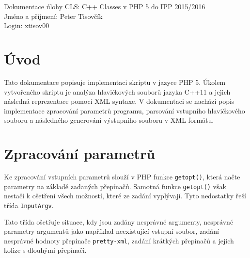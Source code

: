 \documentclass[10pt,a4paper,final]{article}
\begin{document}

  \pagestyle{plain}
  \setcounter{page}{1}
  
  \setlength{\parindent}{1cm}
  \setlength{\parskip}{0.5cm plus4mm minus3mm}
  
  \noindent
  Dokumentace úlohy CLS: C++ Classes v PHP 5 do IPP 2015/2016 \\
  Jméno a příjmení: Peter Tisovčík \\
  Login: xtisov00 \\
  


  \section{Úvod} \label{uvod}

Tato dokumentace popisuje implementaci skriptu v jazyce PHP 5. Úkolem vytvořeného skriptu je analýza hlavičkových souborů jazyka C++11 a jejich následná reprezentace pomocí XML syntaxe. V dokumentaci se nachází popis implementace zpracování parametrů programu, parsování vstupního hlavičkového souboru a následného generování výstupního souboru v XML formátu.

  \section{Zpracování parametrů} \label{zpracovani-parametru}

Ke zpracování vstupních parametrů slouží v PHP funkce \texttt{getopt()}, která načte parametry na základě zadaných přepínačů. Samotná funkce \texttt{getopt()} však nestačí k ošetření všech možností, které ze zadání vyplývají. Tyto nedostatky řeší třída \texttt{InputArgv}.

Tato třída ošetřuje situace, kdy jsou zadány nesprávné argumenty, nesprávné parametry argumentů jako například neexistující vstupní soubor, zadání nesprávné hodnoty přepínače \texttt{pretty-xml}, zadání krátkých přepínačů a jejich kolize s dlouhými přepínači.
	
\end{document}
